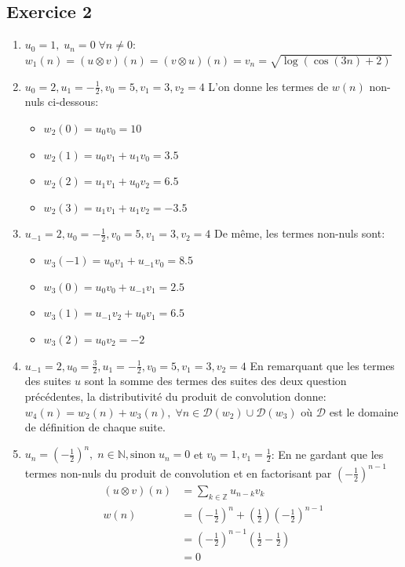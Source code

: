 \documentclass[12pt]{article}
\begin{document}
\subsection*{Exercice 2}
\begin{enumerate}
\item $u_0 = 1, \; u_n = 0 \; \forall n \neq 0$: \newline
$w_1(n) = (u \otimes v)(n) = (v \otimes u)(n) = v_n = \sqrt{\log(\cos(3n)+2)}$ 
\item $u_0 = 2, u_1 = - \frac{1}{2} , v_0 = 5, v_1 = 3, v_2 = 4$ \newline
L'on donne les termes de $w(n)$ non-nuls ci-dessous:
\begin{itemize}
\item $w_2(0) = u_0 v_0 = 10$
\item $w_2(1) = u_0 v_1 + u_1 v_0 = 3.5$
\item $w_2(2) = u_1 v_1 + u_0 v_2 = 6.5$
\item $w_2(3) = u_1 v_1 + u_1 v_2 = - 3.5$
\end{itemize}
\item $u_{-1} = 2, u_0 = - \frac{1}{2} , v_0 = 5, v_1 = 3, v_2 = 4$ \newline
De même, les termes non-nuls sont:
\begin{itemize}
\item $w_3(-1) = u_0 v_1 + u_{-1} v_0 = 8.5$
\item $w_3(0) = u_0 v_0 + u_{-1} v_1 = 2.5$
\item $w_3(1) = u_{-1} v_2 + u_0 v_1 = 6.5$
\item $w_3(2) = u_0 v_2 = -2$
\end{itemize}
\item $u_{-1} = 2, u_0 = \frac{3}{2}, u_1 = - \frac{1}{2}, v_0 = 5, v_1 = 3, v_2 = 4$ \newline 
En remarquant que les termes des suites $u$ sont la somme des termes des suites des deux question précédentes, la distributivité du produit de convolution donne: 
$w_4(n) = w_2(n) + w_3(n), \; \forall n \in \mathcal{D}(w_2) \cup \mathcal{D}(w_3)$ 
où $\mathcal{D}$ est le domaine de définition de chaque suite.
\item $u_n = (-\frac{1}{2})^n, \; n \in \mathbb{N}, \text{sinon} \; u_n = 0$ et $v_0 = 1, v_1 = \frac{1}{2}$: \newline
En ne gardant que les termes non-nuls du produit de convolution et en factorisant par $(-\frac{1}{2})^{n-1}$
\begin{equation*}\begin{split}
(u \otimes v)(n) &= \sum_{k \in \mathbb{Z}} u_{n-k}v_k \\
		w(n)	 &= (-\frac{1}{2})^n + (\frac{1}{2})(-\frac{1}{2})^{n-1} \\
				 &= (-\frac{1}{2})^{n-1}(\frac{1}{2}-\frac{1}{2}) \\
				 &= 0
\end{split}\end{equation*}
\end{enumerate}
\end{document}
